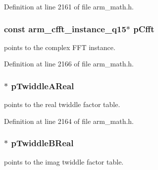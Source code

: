 Definition at line 2161 of file arm\+\_\+math.\+h.

\subsubsection[{\texorpdfstring{p\+Cfft}{pCfft}}]{\setlength{\rightskip}{0pt plus 5cm}const {\bf arm\+\_\+cfft\+\_\+instance\+\_\+q15}$\ast$ p\+Cfft}\hypertarget{structarm__rfft__instance__q15_abd0c3c04ec88379f48e51447e95f092a}{}\label{structarm__rfft__instance__q15_abd0c3c04ec88379f48e51447e95f092a}
points to the complex F\+FT instance. 

Definition at line 2166 of file arm\+\_\+math.\+h.

\subsubsection[{\texorpdfstring{p\+Twiddle\+A\+Real}{pTwiddleAReal}}]{$\ast$ p\+Twiddle\+A\+Real}\hypertarget{structarm__rfft__instance__q15_ac17beaa033ab1ea242d49037276b67e2}{}\label{structarm__rfft__instance__q15_ac17beaa033ab1ea242d49037276b67e2}
points to the real twiddle factor table. 

Definition at line 2164 of file arm\+\_\+math.\+h.

\subsubsection[{\texorpdfstring{p\+Twiddle\+B\+Real}{pTwiddleBReal}}]{$\ast$ p\+Twiddle\+B\+Real}\hypertarget{structarm__rfft__instance__q15_a67a618de57c3a7420ee05fda1a80bf3a}{}\label{structarm__rfft__instance__q15_a67a618de57c3a7420ee05fda1a80bf3a}
points to the imag twiddle factor table. 

